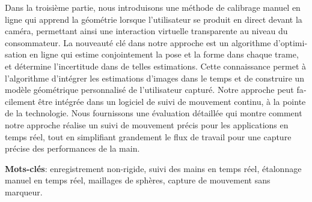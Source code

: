 \begin{otherlanguage}{french}
Dans la troisième partie, nous introduisons une méthode de calibrage manuel en ligne qui apprend la géométrie lorsque l'utilisateur se produit en direct devant la caméra, permettant ainsi une interaction virtuelle transparente au niveau du consommateur. La nouveauté clé dans notre approche est un algorithme d'optimisation en ligne qui estime conjointement la pose et la forme dans chaque trame, et détermine l'incertitude dans de telles estimations. Cette connaissance permet à l'algorithme d'intégrer les estimations d'images dans le temps et de construire un modèle géométrique personnalisé de l'utilisateur capturé. Notre approche peut facilement être intégrée dans un logiciel de suivi de mouvement continu, à la pointe de la technologie. Nous fournissons une évaluation détaillée qui montre comment notre approche réalise un suivi de mouvement précis pour les applications en temps réel, tout en simplifiant grandement le flux de travail pour une capture précise des performances de la main.

\textbf{Mots-clés}: enregistrement non-rigide, suivi des mains en temps réel, étalonnage manuel en temps réel, maillages de sphères, capture de mouvement sans marqueur.

\end{otherlanguage}

